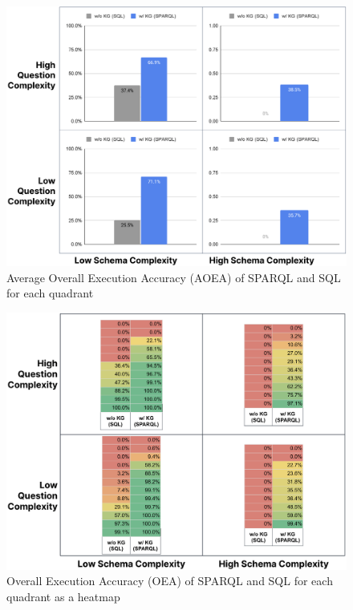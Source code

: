 \documentclass[11pt]{article}
\begin{document}
\begin{figure}[hbtp]
\centering
\includegraphics[scale=0.35]{submissions/Juan2024/results/quadrant.png}
\caption{Average Overall Execution Accuracy (AOEA) of SPARQL and SQL for each quadrant}
\label{fig:fig3}
\end{figure}




\begin{figure}[hbtp]
\centering
\includegraphics[scale=0.35]{submissions/Juan2024/results/quadrant_heatmap.png}
\caption{Overall Execution Accuracy (OEA) of SPARQL and SQL for each quadrant as a heatmap}
\label{fig:fig4}
\end{figure}
\end{document}
